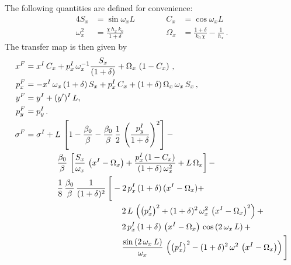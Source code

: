 The following quantities are defined for convenience:
\begin{alignat}{4}
S_x &= \sin \omega_x L \quad \quad \quad &C_x &=  \cos \omega_x L \, \\ \omega_x^2 &= \frac{\chi \, h_x \, k_0}{1+\delta}   &\Omega_x &= \frac{1+\delta}{k_0 \,\chi} - \frac{1}{h_x} \, .
\end{alignat}
%
The transfer map is then given by 
\begin{align}
% 
%
x^F &= x^I \, C_x + p_x^I \, \omega_x^{-1} \frac{S_x}{(1+\delta)} + \Omega_x \, \left(1 - C_x \right) \, , \label{eq:solution_thick_dipole}\\
%
%
p_x^F &= -x^I \, \omega_x \, (1+\delta) \, S_x + p_x^I \, C_x + (1+\delta) \, \Omega_x \, \omega_x \, S_x \, , \\
%
y^F &=  y^I + (y')^I \, L , \\
p_y^F &= p_y^I \, . \label{eq:tckdp4} \\ 
%
\sigma^F &= \sigma^I + L \, \left[ 1 - \frac{\beta_0}{\beta} - \frac{\beta_0}{\beta} \, \frac{1}{2} \, \left(\frac{p^I_y}{1+\delta} \right)^2 \right]  - \\ 
 & \phantom{ \sigma^I +aaa} \frac{\beta_0}{\beta} \, \left[ \frac{S_x}{\omega_x} \, \left(x^I - \Omega_x \right) + \frac{p_x^I \, (1-C_x)}{(1+\delta) \, \omega_x^2} + L \, \Omega_x  \right] - \\
 & \phantom{ \sigma^I + aaa} \frac{1}{8} \, \frac{\beta_0}{\beta} \, \frac{1}{(1+\delta)^2} \, \Bigg[ - 2 \, p_x^I \, (1+\delta) \, (x^I - \Omega_x) + \\  
 & \phantom{ \sigma^I + aaaaaaaaaaaaaaaaaa} 2 \, L \, \left( \left(p_x^I\right)^2 +(1+\delta)^2\,\omega_x^2\,\left(x^I-\Omega_x\right)^2 \right) +  \\ 
 & \phantom{ \sigma^I + aaaaaaaaaaaaaaaaaa} 2 \, p_x^I \, (1+\delta) \, \left(x^I-\Omega_x\right)\, \cos \left(2 \, \omega_x \, L \right) + \notag \\
 & \phantom{ \sigma^I + aaaaaaaaaaaaaaaaaa} \frac{\sin \left(2 \, \omega_x \, L \right)}{\omega_x} \, \left( \left(p_x^I\right)^2 - (1+\delta)^2 \, \omega^2 \, \left(x^I - \Omega_x\right) \right) \Bigg]  \\
%

\end{align}
